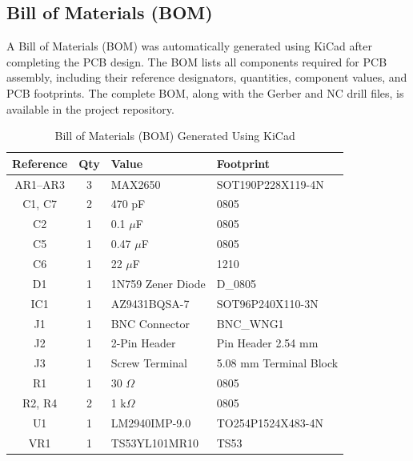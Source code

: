 

\subsection{Bill of Materials (BOM)}

A Bill of Materials (BOM) was automatically generated using KiCad after completing the PCB design. The BOM lists all components required for PCB assembly, including their reference designators, quantities, component values, and PCB footprints. The complete BOM, along with the Gerber and NC drill files, is available in the project repository.

\begin{table}[H]
\centering
\caption{Bill of Materials (BOM) Generated Using KiCad}
\label{tab:bom}
\renewcommand{\arraystretch}{1.25}
\begin{tabular}{|c|c|l|l|}
\hline
\textbf{Reference} & \textbf{Qty} & \textbf{Value} & \textbf{Footprint} \\
\hline
AR1--AR3 & 3 & MAX2650 & SOT190P228X119-4N \\
\hline
C1, C7 & 2 & 470 pF & 0805 \\
\hline
C2 & 1 & 0.1 $\mu$F & 0805 \\
\hline
C5 & 1 & 0.47 $\mu$F & 0805 \\
\hline
C6 & 1 & 22 $\mu$F & 1210 \\
\hline
D1 & 1 & 1N759 Zener Diode & D\_0805 \\
\hline
IC1 & 1 & AZ9431BQSA-7 & SOT96P240X110-3N \\
\hline
J1 & 1 & BNC Connector & BNC\_WNG1 \\
\hline
J2 & 1 & 2-Pin Header & Pin Header 2.54 mm \\
\hline
J3 & 1 & Screw Terminal & 5.08 mm Terminal Block \\
\hline
R1 & 1 & 30 $\Omega$ & 0805 \\
\hline
R2, R4 & 2 & 1 k$\Omega$ & 0805 \\
\hline
U1 & 1 & LM2940IMP-9.0 & TO254P1524X483-4N \\
\hline
VR1 & 1 & TS53YL101MR10 & TS53 \\
\hline
\end{tabular}
\end{table}


